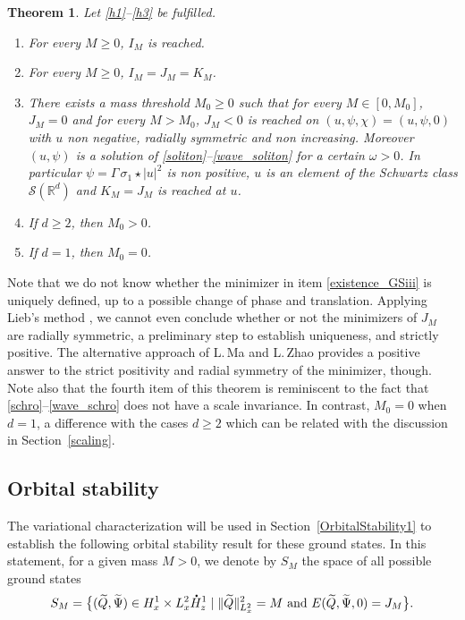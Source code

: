 \documentclass[JEP,XML,SOM,NoEqCountersInSection,NoFloatCountersInSection,Unicode,published]{cedram}
\newenvironment{enumeratei}
{\bgroup\def\theenumi{\roman{enumi}}\def\theenumii{\arabic{enumii}}\begin{enumerate}}
{\end{enumerate}\egroup}
\newtheorem{theo}[lemma]{Theorem}
\theoremstyle{definition}
\newcommand*{\overbigdot}[1]{%
\accentset{\mbox{\large\bfseries .}}{#1}}
\newcommand{\R}{\mathbb{R}}
\begin{document}
\begin{theo}\label{existence_GS}
Let \eqref{h1}--\eqref{h3} be fulfilled.
\begin{enumeratei}
\item\label{existence_GSi} For every $M\geq 0$, $I_{M}$ is reached.
\item\label{existence_GSii}
For every $M\geq 0$, $I_{M}=J_{M}=K_{M}$.
\item\label{existence_GSiii}
There exists a mass threshold $M_{0}\geq 0$ such that for every $M\in[0,M_{0}]$, $J_{M}=0$ and for every $M>M_{0}$, $J_{M}<0$ is reached on $(u,\psi,\chi)=(u,\psi,0)$ with $u$ non negative, radially symmetric and non increasing. Moreover $(u,\psi)$ is a solution of \eqref{soliton}--\eqref{wave_soliton} for a certain $\omega>0$. In particular $\psi=\Gamma\,\sigma_{1}\star|u|^{2}$ is non positive, $u$ is an element of the Schwartz class $\mathcal{S}(\R^{d})$ and $K_{M}=J_{M}$ is reached at $u$.
\item\label{existence_GSiv}
If $d\geq 2$, then $M_{0}>0$.
\item\label{existence_GSv}
If $d=1$, then $M_{0}=0$.
\end{enumeratei}
\end{theo}

Note that we do not know whether the minimizer in item \eqref{existence_GSiii} is uniquely defined, up to a possible change of phase and translation.
Applying Lieb's method \cite{Lieb_Choquard}, we cannot even conclude whether or not the minimizers of $J_{M}$ are
radially symmetric, a preliminary step
to establish uniqueness, and strictly positive.
The alternative approach of L.\,Ma and L.\,Zhao \cite[\S 5]{MaZ} provides a positive answer to the strict positivity and radial symmetry of the minimizer, though.
Note also that the fourth item of this theorem is reminiscent to the fact that \eqref{schro}--\eqref{wave_schro} does not have a scale invariance. In contrast,
$M_{0}=0$ when $d=1$, a difference with the cases $d\geq 2$ which can be related with the discussion in Section~\ref{scaling}.

\subsection{Orbital stability}

The variational characterization will be used in Section~\ref{OrbitalStability1} to establish the following orbital stability result for these ground states. In this statement, for a given mass $M>0$, we denote by $S_{M}$ the space of all possible ground states
\[
S_{M}=\bigl\{(\widetilde{Q},\widetilde{\Psi})\in H_{x}^{1}\times L_{x}^{2}\overbigdot{H}_{z}^{1}\mid\|\widetilde{Q}\|_{L_{x}^{2}}^{2}=M\text{ and }E(\widetilde{Q},\widetilde{\Psi},0)=J_{M}\bigr\}.
\]
\end{document}
